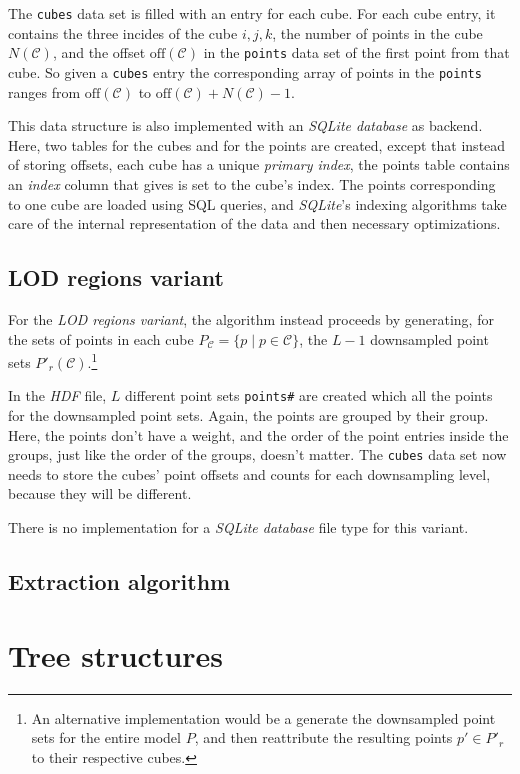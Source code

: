 \documentclass[a4paper,10pt,abstracton,notitlepage]{scrreprt}
\begin{document}
The \texttt{cubes} data set is filled with an entry for each cube. For each cube entry, it contains the three incides of the cube $i, j, k$, the number of points in the cube $N(\mathcal{C})$, and the offset $\text{off}(\mathcal{C})$ in the \texttt{points} data set of the first point from that cube. So given a \texttt{cubes} entry the corresponding array of points in the \texttt{points} ranges from $\text{off}(\mathcal{C})$ to $\text{off}(\mathcal{C}) + N(\mathcal{C}) - 1$.

This data structure is also implemented with an \emph{SQLite database} as backend. Here, two tables for the cubes and for the points are created, except that instead of storing offsets, each cube has a unique \emph{primary index}, the points table contains an \emph{index} column that gives is set to the cube's index. The points corresponding to one cube are loaded using SQL queries, and \emph{SQLite}'s indexing algorithms take care of the internal representation of the data and then necessary optimizations.

\subsection{LOD regions variant}
For the \emph{LOD regions variant}, the algorithm instead proceeds by generating, for the sets of points in each cube $P_{\mathcal{C}} = \{ p \mid p \in \mathcal{C} \}$, the $L-1$ downsampled point sets $P'_{r}(\mathcal{C})$.\footnote{An alternative implementation would be a generate the downsampled point sets for the entire model $P$, and then reattribute the resulting points $p' \in P'_{r}$ to their respective cubes.}

In the \emph{HDF} file, $L$ different point sets \texttt{points\#} are created which all the points for the downsampled point sets. Again, the points are grouped by their group. Here, the points don't have a weight, and the order of the point entries inside the groups, just like the order of the groups, doesn't matter. The \texttt{cubes} data set now needs to store the cubes' point offsets and counts for each downsampling level, because they will be different.

There is no implementation for a \emph{SQLite database} file type for this variant.


\subsection{Extraction algorithm}

\section{Tree structures}
\end{document}
